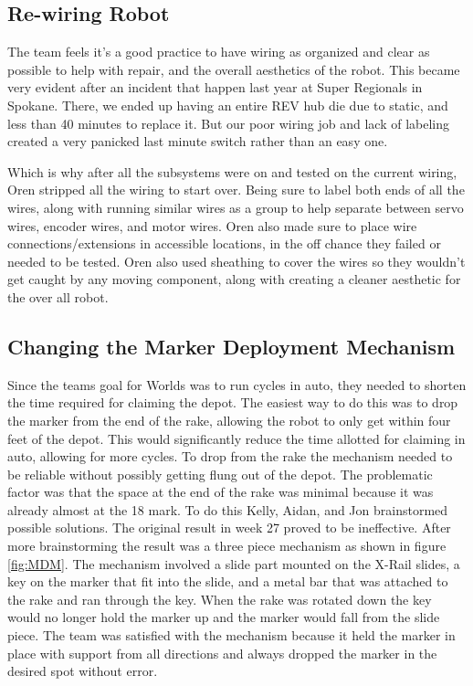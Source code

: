 \documentclass{article}
\begin{document}
\subsection{Re-wiring Robot}
The team feels it's a good practice to have wiring as organized and clear as possible to help with repair, and the overall aesthetics of the robot. This became very evident after an incident that happen last year at Super Regionals in Spokane. There, we ended up having an entire REV hub die due to static, and less than 40 minutes to replace it. But our poor wiring job and lack of labeling created a very panicked last minute switch rather than an easy one. 

Which is why after all the subsystems were on and tested on the current wiring, Oren stripped all the wiring to start over. Being sure to label both ends of all the wires, along with running similar wires as a group to help separate between servo wires, encoder wires, and motor wires. Oren also made sure to place wire connections/extensions in accessible locations, in the off chance they failed or needed to be tested. Oren also used sheathing to cover the wires so they wouldn't get caught by any moving component, along with creating a cleaner aesthetic for the over all robot. 

\subsection{Changing the Marker Deployment Mechanism}
Since the teams goal for Worlds was to run cycles in auto, they needed to shorten the time required for claiming the depot. The easiest way to do this was to drop the marker from the end of the rake, allowing the robot to only get within four feet of the depot. This would significantly reduce the time allotted for claiming in auto, allowing for more cycles. To drop from the rake the mechanism needed to be reliable without possibly getting flung out of the depot. The problematic factor was that the space at the end of the rake was minimal because it was already almost at the 18 mark. To do this Kelly, Aidan, and Jon brainstormed possible solutions. The original result in week 27 proved to be ineffective. After more brainstorming the result was a three piece mechanism as shown in figure \ref{fig:MDM}. The mechanism involved a slide part mounted on the X-Rail slides, a key on the marker that fit into the slide, and a metal bar that was attached to the rake and ran through the key. When the rake was rotated down the key would no longer hold the marker up and the marker would fall from the slide piece. The team was satisfied with the mechanism because it held the marker in place with support from all directions and always dropped the marker in the desired spot without error.
\end{document}
